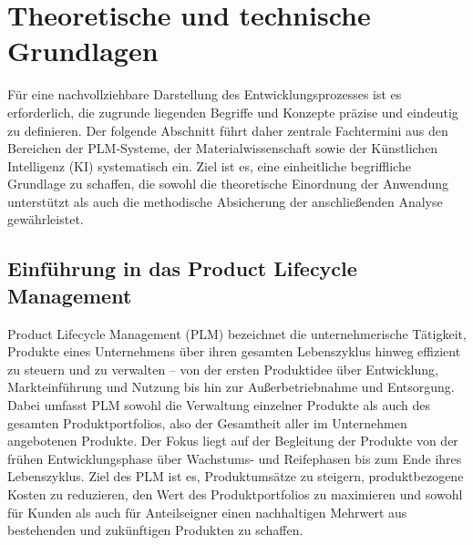 \chapter{Theoretische und technische Grundlagen}
Für eine nachvollziehbare Darstellung des Entwicklungsprozesses ist es erforderlich, die zugrunde liegenden Begriffe und Konzepte präzise und eindeutig zu definieren. Der folgende Abschnitt führt daher zentrale Fachtermini aus den Bereichen der PLM‑Systeme, der Materialwissenschaft sowie der Künstlichen Intelligenz (KI) systematisch ein. Ziel ist es, eine einheitliche begriffliche Grundlage zu schaffen, die sowohl die theoretische Einordnung der Anwendung unterstützt als auch die methodische Absicherung der anschließenden Analyse gewährleistet.
\section{Einführung in das Product Lifecycle Management}
Product Lifecycle Management (PLM) bezeichnet die unternehmerische Tätigkeit, Produkte eines Unternehmens über ihren gesamten Lebenszyklus hinweg effizient zu steuern und zu verwalten – von der ersten Produktidee über Entwicklung, Markteinführung und Nutzung bis hin zur Außerbetriebnahme und Entsorgung. Dabei umfasst PLM sowohl die Verwaltung einzelner Produkte als auch des gesamten Produktportfolios, also der Gesamtheit aller im Unternehmen angebotenen Produkte.
Der Fokus liegt auf der Begleitung der Produkte von der frühen Entwicklungsphase über Wachstums- und Reifephasen bis zum Ende ihres Lebenszyklus. Ziel des PLM ist es, Produktumsätze zu steigern, produktbezogene Kosten zu reduzieren, den Wert des Produktportfolios zu maximieren und sowohl für Kunden als auch für Anteilseigner einen nachhaltigen Mehrwert aus bestehenden und zukünftigen Produkten zu schaffen.  \cite{stark2022product}
